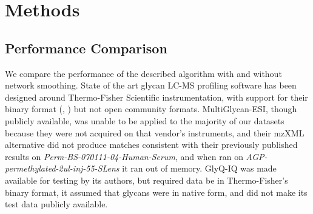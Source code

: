 \section{Methods}











\subsection{Performance Comparison}
    We compare the performance of the described algorithm with and without
    network smoothing. State of the art glycan LC-MS profiling software
    has been designed around Thermo-Fisher Scientific instrumentation, with
    support for their binary format (\cite{Kronewitter2014}, \cite{Yu2013})
    but not open community formats. MultiGlycan-ESI, though publicly available,
    was unable to be applied to the majority of our datasets because they were
    not acquired on that vendor's instruments, and their mzXML alternative
    did not produce matches consistent with their previously published results
    on \textit{Perm-BS-070111-04-Human-Serum}, and when ran on
    \textit{AGP-permethylated-2ul-inj-55-SLens} it ran out of memory. GlyQ-IQ
    was made available for testing by its authors, but required data be in
    Thermo-Fisher's binary format, it assumed that glycans were in native form, and
    did not make its test data publicly available.
